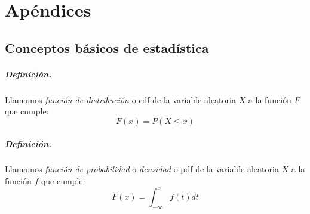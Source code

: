 
%
%
%
%
%
%
%
%

\chapter{Ap\'endices}
\label{sec:apendixes}

\section{Conceptos b\'asicos de estad\'istica}
\label{apendix:stats}

\paragraph{Definici\'on.} Llamamos \emph{funci\'on de distribuci\'on}
 o cdf de la variable aleatoria $X$ a la
funci\'on $F$ que cumple:
\begin{displaymath}
F(x) = P(X \leq x)
\end{displaymath}

\paragraph{Definici\'on.} Llamamos \emph{funci\'on de probabilidad}
 o \emph{densidad} o pdf
 de la variable aleatoria $X$ a la funci\'on $f$ que cumple:
\begin{displaymath}
F(x) = \int_{-\infty}^{x} f(t) dt
\end{displaymath}

